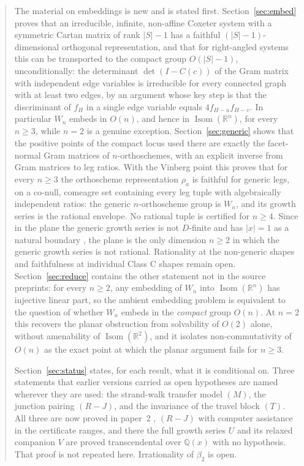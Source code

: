 \documentclass[11pt]{article}
\theoremstyle{definition}
\theoremstyle{remark}
\theoremstyle{definition}
\newcommand{\Q}{\mathbb{Q}}
\newcommand{\R}{\mathbb{R}}
\newcommand{\Isom}{\operatorname{Isom}}
\begin{document}
\begin{abstract}
The material on embeddings is new and is stated first. Section~\ref{sec:embed} proves that an
irreducible, infinite, non-affine Coxeter system with a symmetric Cartan matrix of rank $|S|-1$
has a faithful $(|S|-1)$-dimensional orthogonal representation, and that for right-angled systems
this can be transported to the compact group $O(|S|-1)$, unconditionally: the determinant
$\det(I-C(c))$ of the Gram matrix with independent edge variables is irreducible for every
connected graph with at least two edges, by an argument whose key step is that the discriminant of
$f_H$ in a single edge variable equals $4f_{H-u}f_{H-v}$. In particular $W_n$ embeds in $O(n)$, and
hence in $\Isom(\R^n)$, for every $n\ge3$, while $n=2$ is a genuine exception.
Section~\ref{sec:generic} shows that the positive points of the compact locus used there are
exactly the facet-normal Gram matrices of $n$-orthoschemes, with an explicit inverse from Gram
matrices to leg ratios. With the Vinberg point this proves that for every $n\ge3$ the orthoscheme
representation $\rho_a$ is faithful for generic legs, on a co-null, comeagre set containing every
leg tuple with algebraically independent ratios: the generic $n$-orthoscheme group is $W_n$, and
its growth series is the rational envelope. No rational tuple is certified for $n\ge4$. Since in
the plane the generic growth series is not $D$-finite and has $|x|=1$ as a natural boundary
\cite{paper2}, the plane is the only dimension $n\ge2$ in which the generic growth series is not
rational. Rationality at the non-generic shapes and faithfulness at individual Class C shapes
remain open.
Section~\ref{sec:reduce} contains the other statement not in the source preprints:
for every $n\ge2$, any embedding of $W_n$ into $\Isom(\R^n)$ has injective linear part, so the
ambient embedding problem is equivalent to the question of whether $W_n$ embeds in the
\emph{compact} group $O(n)$. At $n=2$ this recovers the planar obstruction from solvability of
$O(2)$ alone, without amenability of $\Isom(\R^2)$, and it isolates non-commutativity of $O(n)$
as the exact point at which the planar argument fails for $n\ge3$.

Section~\ref{sec:status} states, for each result, what it is conditional on. Three statements
that earlier versions carried as open hypotheses are named wherever they are used: the
strand-walk transfer model $(M)$, the junction pairing $(R\!-\!J)$, and the invariance of the
travel block $(T)$. All three are now proved in paper~2 \cite{paper2}, $(R\!-\!J)$ with computer
assistance in the certificate ranges, and there the full growth series $U$ and its relaxed
companion $V$ are proved transcendental over $\Q(x)$ with no hypothesis. That proof is not
repeated here. Irrationality of $\beta_2$ is open.


\end{abstract}
\end{document}

